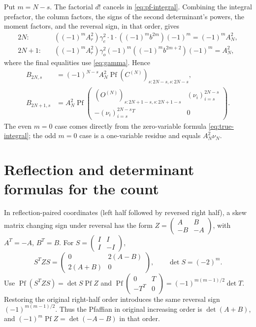 \documentclass[11pt,a4paper]{amsart}
\theoremstyle{remark}\newtheorem{remark}[theorem]{Remark}
\numberwithin{equation}{section}
\DeclareMathOperator{\Pf}{Pf}
\begin{document}
Put $m=N-s$. The factorial $d!$ cancels in \eqref{eq:pf-integral}. Combining the integral prefactor, the column factors, the signs of the second determinant's powers, the moment factors, and the reversal sign, in that order, gives
\[
\begin{aligned}
 2N:\quad&((-1)^mA_r^2)\gamma_e^2\cdot1\cdot((-1)^mb^{2m})(-1)^m
       =(-1)^mA_N^2,\\
 2N+1:\quad&((-1)^mA_r^2)\gamma_o^2(-1)^m((-1)^mb^{2m+2})(-1)^m
       =A_N^2,
\end{aligned}
\]
where the final equalities use \eqref{eq:gamma}. Hence
\begin{align}
 B_{2N,s}&=(-1)^{N-s}A_N^2\Pf(C^{(N)})_{s:2N-s,s:2N-s},\label{eq:even-pf}\\
 B_{2N+1,s}&=A_N^2\Pf\begin{pmatrix}
 (O^{(N)})_{s:2N+1-s,s:2N+1-s}&(\nu_i)_{i=s}^{2N-s}\\
 -(\nu_i)_{i=s}^{2N-s}{}^T&0
 \end{pmatrix}.\label{eq:odd-pf}
\end{align}
The even $m=0$ case comes directly from the zero-variable formula \eqref{eq:true-integral}; the odd $m=0$ case is a one-variable residue and equals $A_N^2\nu_N$.

\section{Reflection and determinant formulas for the count}\label{sec:fold}
In reflection-paired coordinates (left half followed by reversed right half), a skew matrix changing sign under reversal has the form
$Z=\begin{pmatrix}A&B\\-B&-A\end{pmatrix}$, with $A^T=-A$, $B^T=B$. For $S=\begin{pmatrix}I&I\\I&-I\end{pmatrix}$,
\[
 S^TZS=\begin{pmatrix}0&2(A-B)\\2(A+B)&0\end{pmatrix},\qquad \det S=(-2)^m.
\]
Use $\Pf(S^TZS)=\det S\Pf Z$ and $\Pf\begin{pmatrix}0&T\\-T^T&0\end{pmatrix}=(-1)^{m(m-1)/2}\det T$. Restoring the original right-half order introduces the same reversal sign $(-1)^{m(m-1)/2}$. Thus the Pfaffian in original increasing order is $\det(A+B)$, and $(-1)^m\Pf Z=\det(-A-B)$ in that order.
\end{document}
